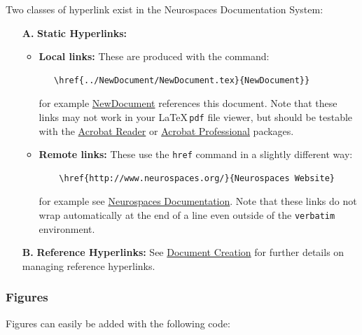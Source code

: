 \documentclass[12pt]{article}
\begin{document}
Two classes of hyperlink exist in the Neurospaces Documentation System:

\begin{itemize}
\item[{\bf A.}]{\bf Static Hyperlinks:} 
   \begin{itemize}
      \item{\bf Local links:} These are produced with the command:
\begin{verbatim}
   \href{../NewDocument/NewDocument.tex}{NewDocument}}
\end{verbatim}
for example \href{../NewDocument/NewDocument.tex}{NewDocument} references this document.
Note that these links may not work in your \LaTeX\,{\tt pdf} file viewer, but should be testable with the \href{http://get.adobe.com/reader/}{Acrobat Reader} or \href{http://www.adobe.com/products/acrobatpro/tryout.html}{Acrobat Professional} packages.
      \item {\bf Remote links:} These use the {\tt href} command in a slightly different way:
\begin{verbatim}
    \href{http://www.neurospaces.org/}{Neurospaces Website}
\end{verbatim}
for example see \href{http://www.neurospaces.org/}{Neurospaces Documentation}. Note that these links do not wrap automatically at the end of a line even outside of the {\tt verbatim} environment.
\end{itemize}

\item[{\bf B.}]{\bf Reference Hyperlinks:} See \href{../document-create/document-create.tex}{Document Creation} for further details on managing reference hyperlinks.

\end{itemize}

\subsubsection*{Figures}

Figures can easily be added with the following code:
\end{document}
